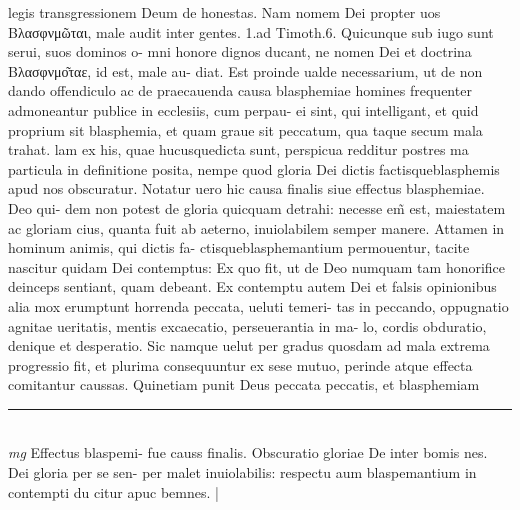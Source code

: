 \documentclass{article}
\begin{document}
\begin{pages}
legis transgressionem Deum de honestas. Nam nomem Dei propter uos Βλασφνμῶται, male audit inter gentes. 1.ad Timoth.6. Quicunque  sub iugo sunt serui, suos dominos o- mni honore dignos ducant, ne nomen Dei et doctrina Βλασφνμο͂ταε, id est, male au- diat. Est proinde ualde necessarium, ut de non dando offendiculo ac de praecauenda causa blasphemiae homines frequenter admoneantur publice in ecclesiis, cum perpau- ei sint, qui intelligant, et quid proprium sit blasphemia, et quam graue sit peccatum, qua taque  secum mala trahat. lam ex his, quae hucusquedicta sunt, perspicua redditur postres ma particula in definitione posita, nempe quod gloria Dei dictis factisqueblasphemis apud nos obscuratur. Notatur uero hic causa finalis siue effectus blasphemiae. Deo qui- dem non potest de gloria quicquam detrahi: necesse em̃ est, maiestatem ac gloriam cius, quanta fuit ab aeterno, inuiolabilem semper manere. Attamen in hominum animis, qui dictis fa- ctisqueblasphemantium permouentur, tacite nascitur quidam Dei contemptus: Ex quo fit, ut de Deo numquam tam honorifice deinceps sentiant, quam debeant. Ex contemptu autem Dei et falsis opinionibus alia mox erumptunt horrenda peccata, ueluti temeri- tas in peccando, oppugnatio agnitae ueritatis, mentis excaecatio, perseuerantia in ma- lo, cordis obduratio, denique  et desperatio. Sic namque uelut per gradus quosdam ad mala extrema progressio fit, et plurima consequuntur ex sese mutuo, perinde atque effecta comitantur caussas. Quinetiam punit Deus peccata peccatis, et blasphemiam  \pend
\vspace{0.5cm}\noindent
\vspace{0.2cm}\rule{1cm}{0.2pt}\\ 
\hspace{0.2cm}\textit{mg}
\footnotesize Effectus blaspemi- fue causs finalis. Obscuratio gloriae De inter bomis nes.  Dei gloria per se sen- per malet inuiolabilis: respectu aum blaspemantium in contempti du citur apuc bemnes. 
\normalsize| 

\end{pages}
\end{document}
